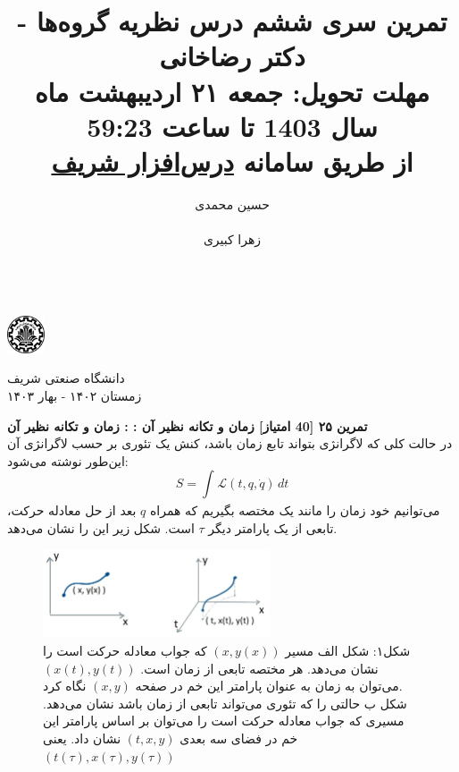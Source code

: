 \documentclass{article}
\title{
	\vspace{-0.8em}
تمرین سری ششم درس نظریه گروه‌ها - دکتر رضاخانی
\\
{\normalsize
\textbf{مهلت تحویل:
جمعه ۲۱ اردیبهشت ماه سال 1403 تا ساعت 59:23
\\
\vspace{-0.4em}
از طریق سامانه
\href{https://cw.sharif.edu/}{درس‌افزار شریف}
}
}
\vspace{-0.6em}
}
\author{
حسین محمدی\\
  \lr{
  		\href{mailto:hossein.mohammadi.00427@gmail.com}{\texttt{	hossein.mohammadi.00427@gmail.com}}} \\
  \And
  زهرا کبیری\\
 \lr{
  		\href{mailto:kabiri.zahra98@gmail.com}{ \texttt{kabiri.zahra98@gmail.com}}}\\
  }
\newenvironment{exercise}[3][\unskip]{%
	\par
	\noindent
	\textbf{تمرین
		#1
		[#2 امتیاز] 
		\def\temp{#3}\ifx\temp\empty
		: 
		\else
		: #3 \vspace{0.5em} \\ \noindent
		\fi
}}{}
\begin{document}
\begin{minipage}{0.1\textwidth}%
\includegraphics[width=1.1cm]{sharif-logo.png}
\end{minipage}%
\hfill%
\begin{minipage}{0.9\textwidth}\raggedleft
دانشگاه صنعتی شریف\\
زمستان ۱۴۰۲ - بهار ۱۴۰۳\\
\end{minipage}

\makepertitle


\begin{exercise}[۲۵]{40}{زمان و تکانه نظیر آن}
در حالت کلی که لاگرانژی بتواند تابع زمان باشد، کنش یک تئوری بر حسب لاگرانژی آن این‌طور نوشته می‌شود:
\begin{equation*}
    S=\int_{}^{} \mathcal{L} (t,q,\dot{q}) \,dt
\end{equation*}
می‌توانیم خود زمان را مانند یک مختصه بگیریم که همراه 
$q$ 
بعد از حل معادله حرکت، تابعی از یک پارامتر دیگر 
$\tau$ 
است. شکل زیر این را نشان می‌دهد. \\
\begin{center}
\begin{figure}[!h]
    \centering
    \includegraphics[width=0.6\textwidth]{Pics/fig1.JPG}
    \caption{
    شکل۱: 
شکل الف مسیر 
$(x,y(x))$ 
که جواب معادله حرکت است را نشان می‌دهد. هر مختصه تابعی از زمان است. 
$(x(t),y(t))$ 
می‌توان به زمان به عنوان پارامتر این خم در صفحه 
$(x,y)$ نگاه کرد.\\
شکل ب حالتی را که تئوری می‌تواند تابعی از زمان باشد نشان می‌دهد. مسیری که جواب معادله حرکت است را می‌توان بر اساس پارامتر این خم در فضای سه بعدی 
$(t,x,y)$ 
نشان داد. یعنی 
$(t(\tau),x(\tau),y(\tau))$
    }
\end{figure}
\end{center}



\end{exercise}
\end{document}
